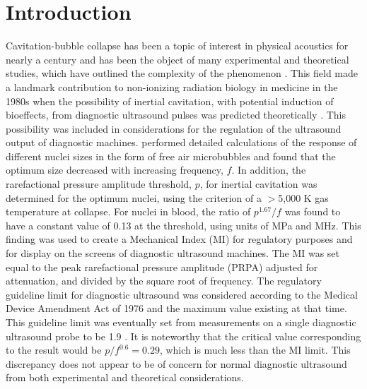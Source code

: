 \documentclass[%
preprint,%
author-year,%
]{jasatex}
\begin{document}



\maketitle


\section{Introduction}
\label{sec:intro}

Cavitation-bubble collapse has been a topic of interest in physical
acoustics for nearly a century and has been the object of many
experimental and theoretical studies, which have outlined the
complexity of the phenomenon \cite[]{leighton1997}.  This field made a
landmark contribution to non-ionizing radiation biology in medicine in
the 1980s when the possibility of inertial cavitation, with potential
induction of bioeffects, from diagnostic ultrasound pulses was
predicted theoretically \cite[]{flynn1982,apfel1982}.  This
possibility was included in considerations for the regulation of the
ultrasound output of diagnostic machines.  \cite{apfel1991} performed
detailed calculations of the response of different nuclei sizes in
the form of free air microbubbles and found that the optimum size
decreased with increasing frequency, $f$.  In addition, the
rarefactional pressure amplitude threshold, $p$, for inertial
cavitation was determined for the optimum nuclei, using the criterion
of a $>$5,000 K gas temperature at collapse.  For nuclei in blood, the
ratio of $p^{1.67}/f$ was found to have a constant value of 0.13 at
the threshold, using units of MPa and MHz.  This finding was used to
create a Mechanical Index (MI) for regulatory purposes and for display
on the screens of diagnostic ultrasound machines.  The MI was set
equal to the peak rarefactional pressure amplitude (PRPA) adjusted for
attenuation, and divided by the square root of frequency.  The
regulatory guideline limit for diagnostic ultrasound was considered
according to the Medical Device Amendment Act of 1976 and the maximum
value existing at that time.  This guideline limit was eventually set
from measurements on a single diagnostic ultrasound probe to be 1.9
\cite[]{nyborg2001}.  It is noteworthy that the critical value
corresponding to the \cite{apfel1991} result would be
\textbf{$p/f^{0.6}=0.29$}, which is much less than the MI limit.  This
discrepancy does not appear to be of concern for normal diagnostic
ultrasound from both experimental \cite[]{carstensen2000} and
theoretical \cite[]{church2002} considerations.
\end{document}
